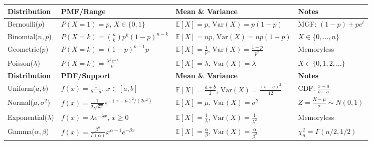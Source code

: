 \documentclass[10pt,letterpaper]{article}
\newcommand{\Var}{\text{Var}}
\newcommand{\E}{\mathbb{E}}
\begin{document}
\vspace{3mm}


\begin{center}
    



\small
\setlength{\tabcolsep}{16pt}

\begin{tabular}{|l|l|l|l|}
\hline
\textbf{Distribution} & \textbf{PMF/Range} & \textbf{Mean \& Variance} & \textbf{Notes} \\
\hline
Bernoulli($p$) & $P(X=1)=p$, $X \in \{0,1\}$ & $\E[X]=p$, $\Var(X)=p(1-p)$ & MGF: $(1-p)+pe^t$ \\
\hline
Binomial($n,p$) & $P(X=k)=\binom{n}{k}p^k(1-p)^{n-k}$ & $\E[X]=np$, $\Var(X)=np(1-p)$ & $X \in \{0,\ldots,n\}$ \\
\hline
Geometric($p$) & $P(X=k)=(1-p)^{k-1}p$ & $\E[X]=\frac{1}{p}$, $\Var(X)=\frac{1-p}{p^2}$ & Memoryless \\
\hline
Poisson($\lambda$) & $P(X=k)=\frac{\lambda^k e^{-\lambda}}{k!}$ & $\E[X]=\lambda$, $\Var(X)=\lambda$ & $X \in \{0,1,2,\ldots\}$ \\
\hline
\hline
\textbf{Distribution} & \textbf{PDF/Support} & \textbf{Mean \& Variance} & \textbf{Notes} \\
\hline
Uniform($a,b$) & $f(x)=\frac{1}{b-a}$, $x \in [a,b]$ & $\E[X]=\frac{a+b}{2}$, $\Var(X)=\frac{(b-a)^2}{12}$ & CDF: $\frac{x-a}{b-a}$ \\
\hline
Normal($\mu,\sigma^2$) & $f(x)=\frac{1}{\sigma\sqrt{2\pi}}e^{-(x-\mu)^2/(2\sigma^2)}$ & $\E[X]=\mu$, $\Var(X)=\sigma^2$ & $Z=\frac{X-\mu}{\sigma} \sim N(0,1)$ \\
\hline
Exponential($\lambda$) & $f(x)=\lambda e^{-\lambda x}$, $x \ge 0$ & $\E[X]=\frac{1}{\lambda}$, $\Var(X)=\frac{1}{\lambda^2}$ & Memoryless \\
\hline
Gamma($\alpha,\beta$) & $f(x)=\frac{\beta^\alpha}{\Gamma(\alpha)}x^{\alpha-1}e^{-\beta x}$ & $\E[X]=\frac{\alpha}{\beta}$, $\Var(X)=\frac{\alpha}{\beta^2}$ & $\chi^2_n = \Gamma(n/2,1/2)$ \\

\end{tabular}
\end{center}
\end{document}
